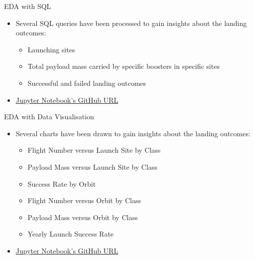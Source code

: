 \begin{frame}{EDA with SQL}
    \begin{itemize}
        \item Several SQL queries have been processed to gain insights about the landing outcomes:
        \begin{itemize}
            \item Launching sites
            \item Total payload mass carried by specific boosters in specific sites
            \item Successful and failed landing outcomes
        \end{itemize}
        \item \href{https://github.com/eyamrog/ibm_data_science/blob/main/10_Data_Science_Capstone_SQL_Notebook_for_Peer_Assignment.ipynb}{\uline{Jupyter Notebook's GitHub URL}}
    \end{itemize}
\end{frame}

\begin{frame}{EDA with Data Visualisation}
    \begin{itemize}
        \item Several charts have been drawn to gain insights about the landing outcomes:
        \begin{itemize}
            \item Flight Number versus Launch Site by Class
            \item Payload Mass versus Launch Site by Class
            \item Success Rate by Orbit
            \item Flight Number versus Orbit by Class
            \item Payload Mass versus Orbit by Class
            \item Yearly Launch Success Rate
        \end{itemize}
        \item \href{https://github.com/eyamrog/ibm_data_science/blob/main/10_Data_Science_Capstone_EDA_with_Visualisation.ipynb}{\uline{Jupyter Notebook's GitHub URL}}
    \end{itemize}
\end{frame}

